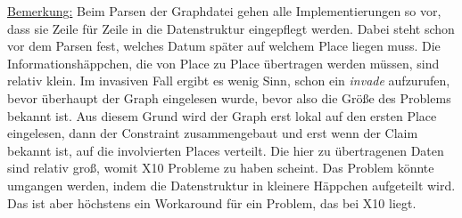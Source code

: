 \underline{Bemerkung:}
Beim Parsen der Graphdatei gehen alle Implementierungen so vor, dass sie Zeile für Zeile in die Datenstruktur eingepflegt werden. Dabei steht schon vor dem Parsen fest, welches Datum später auf welchem Place liegen muss. Die Informationshäppchen, die von Place zu Place übertragen werden müssen, sind relativ klein. Im invasiven Fall ergibt es wenig Sinn, schon ein \textit{invade} aufzurufen, bevor überhaupt der Graph eingelesen wurde, bevor also die Größe des Problems bekannt ist. Aus diesem Grund wird der Graph erst lokal auf den ersten Place eingelesen, dann der Constraint zusammengebaut und erst wenn der Claim bekannt ist, auf die involvierten Places verteilt. Die hier zu übertragenen Daten sind relativ groß, womit X10 Probleme zu haben scheint. Das Problem könnte umgangen werden, indem die Datenstruktur in kleinere Häppchen aufgeteilt wird. Das ist aber höchstens ein Workaround für ein Problem, das bei X10 liegt.
